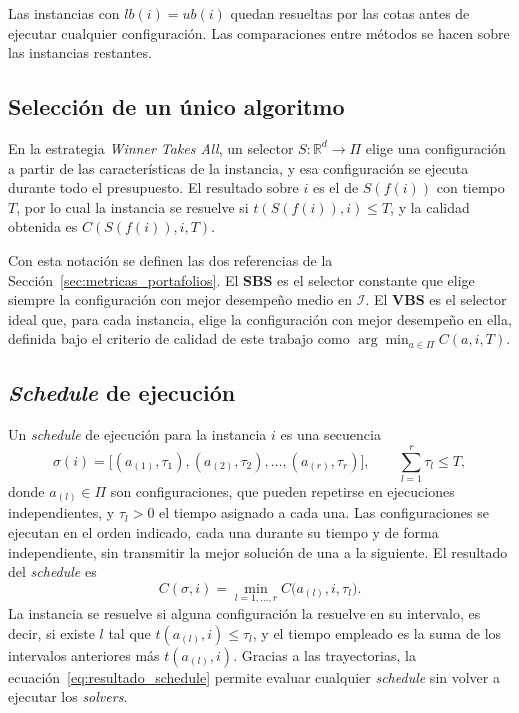 Las instancias con $lb(i) = ub(i)$ quedan resueltas por las cotas antes de
ejecutar cualquier configuración. Las comparaciones entre métodos se hacen
sobre las instancias restantes.

\subsection{Selección de un único algoritmo}
En la estrategia \textit{Winner Takes All}, un selector
$S: \mathbb{R}^{d} \rightarrow \Pi$ elige una configuración a partir de las
características de la instancia, y esa configuración se ejecuta durante todo
el presupuesto. El resultado sobre $i$ es el de $S(f(i))$ con tiempo $T$, por
lo cual la instancia se resuelve si $t(S(f(i)), i) \le T$, y la calidad
obtenida es $C(S(f(i)), i, T)$.

Con esta notación se definen las dos referencias de la
Sección~\ref{sec:metricas_portafolios}. El \textbf{SBS} es el selector
constante que elige siempre la configuración con mejor desempeño medio en
$\mathcal{I}$. El \textbf{VBS} es el selector ideal que, para cada instancia,
elige la configuración con mejor desempeño en ella, definida bajo el criterio
de calidad de este trabajo como $\arg\min_{a \in \Pi} C(a, i, T)$.

\subsection{\textit{Schedule} de ejecución}
Un \textit{schedule} de ejecución para la instancia $i$ es una secuencia
\begin{equation}
  \sigma(i) = \bigl[ (a_{(1)}, \tau_1), (a_{(2)}, \tau_2), \dots,
  (a_{(r)}, \tau_r) \bigr],
  \qquad \sum_{l=1}^{r} \tau_l \le T,
  \label{eq:schedule}
\end{equation}
donde $a_{(l)} \in \Pi$ son configuraciones, que pueden repetirse en
ejecuciones independientes, y $\tau_l > 0$ el
tiempo asignado a cada una. Las configuraciones se ejecutan en el orden
indicado, cada una durante su tiempo y de forma independiente, sin transmitir
la mejor solución de una a la siguiente. El resultado del \textit{schedule} es
\begin{equation}
  C(\sigma, i) = \min_{l = 1, \dots, r} C\bigl(a_{(l)}, i, \tau_l\bigr).
  \label{eq:resultado_schedule}
\end{equation}
La instancia se resuelve si alguna configuración la resuelve en su
intervalo, es decir, si existe $l$ tal que $t(a_{(l)}, i) \le \tau_l$, y el
tiempo empleado es la suma de los intervalos anteriores más
$t(a_{(l)}, i)$. Gracias a las trayectorias, la
ecuación~\eqref{eq:resultado_schedule} permite evaluar cualquier
\textit{schedule} sin volver a ejecutar los \textit{solvers}.

